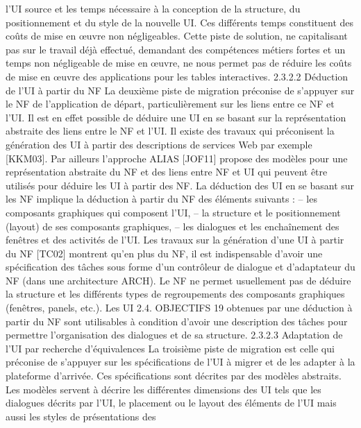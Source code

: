 \documentclass{article}
\begin{document}
l’UI source et les temps n\'{e}cessaire \`{a} la conception de la structure, du positionnement et du style de
la nouvelle UI. Ces diff\'{e}rents temps constituent des co\^{u}ts de mise en œuvre non n\'{e}gligeables. Cette
piste de solution, ne capitalisant pas sur le travail d\'{e}j\`{a} effectu\'{e}, demandant des comp\'{e}tences m\'{e}tiers
fortes et un temps non n\'{e}gligeable de mise en œuvre, ne nous permet pas de r\'{e}duire les co\^{u}ts de
mise en œuvre des applications pour les tables interactives.
2.3.2.2
D\'{e}duction de l’UI \`{a} partir du NF
La deuxi\`{e}me piste de migration pr\'{e}conise de s’appuyer sur le NF de l’application de d\'{e}part,
particuli\`{e}rement sur les liens entre ce NF et l’UI. Il est en effet possible de d\'{e}duire une UI en se
basant sur la repr\'{e}sentation abstraite des liens entre le NF et l’UI. Il existe des travaux qui pr\'{e}conisent
la g\'{e}n\'{e}ration des UI \`{a} partir des descriptions de services Web par exemple [KKM03]. Par ailleurs
l’approche ALIAS [JOF11] propose des mod\`{e}les pour une repr\'{e}sentation abstraite du NF et des liens
entre NF et UI qui peuvent \^{e}tre utilis\'{e}s pour d\'{e}duire les UI \`{a} partir des NF. La d\'{e}duction des UI en se
basant sur les NF implique la d\'{e}duction \`{a} partir du NF des \'{e}l\'{e}ments suivants :
– les composants graphiques qui composent l’UI,
– la structure et le positionnement (layout) de ses composants graphiques,
– les dialogues et les encha\^{i}nement des fen\^{e}tres et des activit\'{e}s de l’UI.
Les travaux sur la g\'{e}n\'{e}ration d’une UI \`{a} partir du NF [TC02] montrent qu’en plus du NF, il est
indispensable d’avoir une sp\'{e}ciﬁcation des t\^{a}ches sous forme d’un contr\^{o}leur de dialogue et d’adaptateur du NF (dans une architecture ARCH). Le NF ne permet usuellement pas de d\'{e}duire la structure
et les diff\'{e}rents types de regroupements des composants graphiques (fen\^{e}tres, panels, etc.). Les UI
2.4. OBJECTIFS
19
obtenues par une d\'{e}duction \`{a} partir du NF sont utilisables \`{a} condition d’avoir une description des
t\^{a}ches pour permettre l’organisation des dialogues et de sa structure.
2.3.2.3
Adaptation de l’UI par recherche d’\'{e}quivalences
La troisi\`{e}me piste de migration est celle qui pr\'{e}conise de s’appuyer sur les sp\'{e}ciﬁcations de l’UI
\`{a} migrer et de les adapter \`{a} la plateforme d’arriv\'{e}e. Ces sp\'{e}ciﬁcations sont d\'{e}crites par des mod\`{e}les
abstraits. Les mod\`{e}les servent \`{a} d\'{e}crire les diff\'{e}rentes dimensions des UI tels que les dialogues d\'{e}crits
par l’UI, le placement ou le layout des \'{e}l\'{e}ments de l’UI mais aussi les styles de pr\'{e}sentations des
\end{document}
